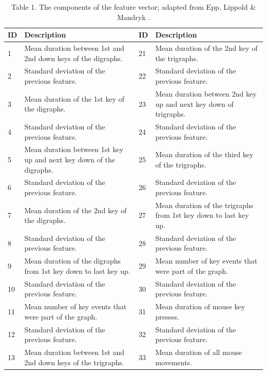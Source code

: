\documentclass[a4paper]{llncs}
\begin{document}
\begin{table}[!t]
\centering
\caption{Table 1. The components of the feature vector; adapted from Epp, Lippold \& Mandryk \cite{epp2011identifying}.}
\label{tab_features}
    \begin{tabular}{ | l | l || l | l | }
    \hline
    ID          & Description           & ID               & Description  \\
    \hline
    1 & Mean duration between 1st and 2nd down keys of the digraphs.  & 21 & Mean duration of the 2nd key of the trigraphs.\\
    \hline
    2 & Standard deviation of the previous feature.                   & 22 & Standard deviation of the previous feature.\\
    \hline
    3 & Mean duration of the 1st key of the digraphs.                 & 23 & Mean duration between 2nd key up and next key down of trigraphs.\\
    \hline
    4 & Standard deviation of the previous feature.                   & 24 & Standard deviation of the previous feature.\\
    \hline
    5 & Mean duration between 1st key up and next key down of the digraphs. & 25 & Mean duration of the third key of the trigraphs.\\
    \hline
    6 & Standard deviation of the previous feature. & 26 & Standard deviation of the previous feature.\\
    \hline
    7 & Mean duration of the 2nd key of the digraphs. & 27 & Mean duration of the trigraphs from 1st key down to last key up.\\
    \hline
    8 & Standard deviation of the previous feature. & 28 & Standard deviation of the previous feature.\\
    \hline
    9 & Mean duration of the digraphs from 1st key down to last key up. & 29 & Mean number of key events that were part of the graph.\\
    \hline
    10 & Standard deviation of the previous feature. & 30 & Standard deviation of the previous feature.\\
    \hline
    11 & Mean number of key events that were part of the graph. & 31 & Mean duration of mouse key presses.\\
    \hline
    12 & Standard deviation of the previous feature. & 32 & Standard deviation of the previous feature.\\
    \hline
    13 & Mean duration between 1st and 2nd down keys of the trigraphs. & 33 & Mean duration of all mouse movements.\\

\end{tabular}
\end{table}
\end{document}
